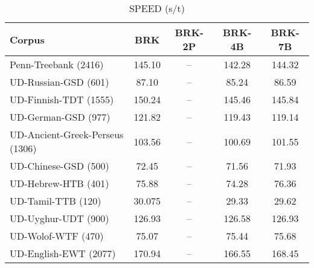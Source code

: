 \begin{table}[h]
    \centering
    \caption{SPEED (s/t)}
    \label{tab:speed}
    \begin{tabular}{|l|c|c|c|c|}
        \hline
        \textbf{Corpus}                 & \textbf{BRK} & \textbf{BRK-2P} & \textbf{BRK-4B} & \textbf{BRK-7B} \\ 
        \hline
        Penn-Treebank (2416)            & 145.10       & --              & 142.28          & 144.32          \\
        UD-Russian-GSD (601)            & 87.10        & --              & 85.24           & 86.59           \\
        UD-Finnish-TDT (1555)           & 150.24       & --              & 145.46          & 145.84          \\
        UD-German-GSD (977)             & 121.82       & --              & 119.43          & 119.14          \\
        UD-Ancient-Greek-Perseus (1306) & 103.56       & --              & 100.69          & 101.55          \\
        UD-Chinese-GSD (500)            & 72.45        & --              & 71.56           & 71.93           \\
        UD-Hebrew-HTB (401)             & 75.88        & --              & 74.28           & 76.36           \\  
        UD-Tamil-TTB (120)              & 30.075       & --              & 29.33           & 29.62           \\
        UD-Uyghur-UDT (900)             & 126.93       & --              & 126.58          & 126.93          \\
        UD-Wolof-WTF (470)              & 75.07        & --              & 75.44           & 75.68           \\
        UD-English-EWT (2077)           & 170.94       & --              & 166.55          & 168.45          \\
        \hline 
    \end{tabular}
\end{table}